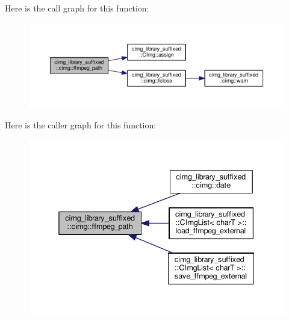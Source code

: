 Here is the call graph for this function\+:
\nopagebreak
\begin{figure}[H]
\begin{center}
\leavevmode
\includegraphics[width=350pt]{d4/d9b/namespacecimg__library__suffixed_1_1cimg_a5b8fba26176c5506b1eb27e70ca44889_cgraph}
\end{center}
\end{figure}
Here is the caller graph for this function\+:
\nopagebreak
\begin{figure}[H]
\begin{center}
\leavevmode
\includegraphics[width=338pt]{d4/d9b/namespacecimg__library__suffixed_1_1cimg_a5b8fba26176c5506b1eb27e70ca44889_icgraph}
\end{center}
\end{figure}
\mbox{\label{namespacecimg__library__suffixed_1_1cimg_a9f8980f1308177adebab5f8f52a79835}} 
